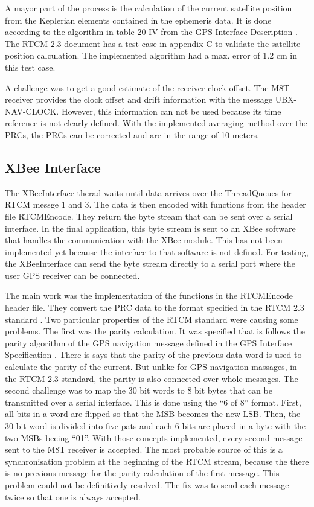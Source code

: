 A mayor part of the process is the calculation of the current satellite position from the Keplerian elements contained in the ephemeris data.
It is done according to the algorithm in table 20-IV from the GPS Interface Description \cite{IS-GPS-200}.
The RTCM 2.3 document \cite{RTCM_2.3} has a test case in appendix C to validate the satellite position calculation.
The implemented algorithm had a max. error of 1.2 cm in this test case.

A challenge was to get a good estimate of the receiver clock offset.
The M8T receiver provides the clock offset and drift information with the message UBX-NAV-CLOCK.
However, this information can not be used because its time reference is not clearly defined.
With the implemented averaging method over the PRCs, the PRCs can be corrected and are in the range of 10 meters.

\subsection{XBee Interface}

The XBeeInterface therad waits until data arrives over the ThreadQueues for RTCM messge 1 and 3.
The data is then encoded with functions from the header file RTCMEncode.
They return the byte stream that can be sent over a serial interface.
In the final application, this byte stream is sent to an XBee software that handles the communication with the XBee module.
This has not been implemented yet because the interface to that software is not defined.
For testing, the XBeeInterface can send the byte stream directly to a serial port where the user GPS receiver can be connected.

The main work was the implementation of the functions in the RTCMEncode header file.
They convert the PRC data to the format specified in the RTCM 2.3 standard \cite{RTCM_2.3}.
Two particular properties of the RTCM standard were causing some problems.
The first was the parity calculation.
It was specified that is follows the parity algorithm of the GPS navigation message defined in the GPS Interface Specification \cite{IS-GPS-200}.
There is says that the parity of the previous data word is used to calculate the parity of the current.
But unlike for GPS navigation massages, in the RTCM 2.3 standard, the parity is also connected over whole messages.
The second challenge was to map the 30 bit words to 8 bit bytes that can be transmitted over a serial interface.
This is done using the ``6 of 8'' format.
First, all bits in a word are flipped so that the MSB becomes the new LSB.
Then, the 30 bit word is divided into five pats and each 6 bits are placed in a byte with the two MSBs beeing ``01''.
With those concepts implemented, every second message sent to the M8T receiver is accepted.
The most probable source of this is a synchronisation problem at the beginning of the RTCM stream, because the there is no previous message for the parity calculation of the first message.
This problem could not be definitively resolved.
The fix was to send each message twice so that one is always accepted.

